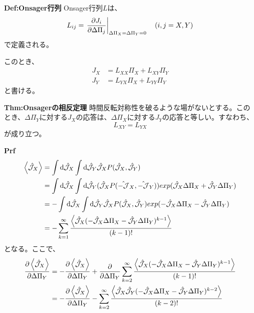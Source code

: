 \documentclass[a4paper,11pt]{jsarticle}
\begin{document}
\begin{itembox}[l]{\textbf{Def:Onsager行列}}
    Onsager行列$L$は、
    \begin{equation}
        L_{ij} = \left.\pdv{J_i}{\Delta \Pi_j}\right|_{\Delta \Pi_X=\Delta \Pi_Y=0} \quad (i,j = X,Y)
    \end{equation}
    で定義される。
\end{itembox}
このとき、
\begin{align}
    J_X &= L_{XX}\Pi_X + L_{XY}\Pi_Y\\
    J_Y &= L_{YX}\Pi_X + L_{YY}\Pi_Y
\end{align}
と書ける。\\
\begin{itembox}[l]{\textbf{Thm:Onsagerの相反定理}}
    時間反転対称性を破るような場がないとする。このとき、$\Delta \Pi_Y$に対する$J_X$の応答は、$\Delta \Pi_X$に対する$J_Y$の応答と等しい。すなわち、
    \begin{equation}
        L_{XY} = L_{YX}
    \end{equation}
    が成り立つ。
\end{itembox}
\textbf{Prf}\\
\begin{align}
    \ev{\hat{\mathcal{J}}_X} &= \int \dd \hat{\mathcal{J}}_X \int \dd \hat{\mathcal{J}}_Y \hat{\mathcal{J}}_X P(\hat{\mathcal{J}}_X, \hat{\mathcal{J}}_Y)\\
    &= \int \dd \hat{\mathcal{J}}_X \int \dd \hat{\mathcal{J}}_Y (\hat{\mathcal{J}}_X P(\hat{-\mathcal{J}}_X, \hat{-\mathcal{J}}_Y))exp(\hat{\mathcal{J}}_X \Delta \Pi_X + \hat{\mathcal{J}}_Y \Delta \Pi_Y)\\
    &= -\int \dd \hat{\mathcal{J}}_X \int \dd \hat{\mathcal{J}}_Y \hat{\mathcal{J}}_X P(\hat{\mathcal{J}}_X, \hat{\mathcal{J}}_Y)exp(-\hat{\mathcal{J}}_X \Delta \Pi_X - \hat{\mathcal{J}}_Y \Delta \Pi_Y)\\
    &= -\sum_{k=1}^{\infty} \frac{\ev{\hat{\mathcal{J}}_X(-\hat{\mathcal{J}}_X\Delta \Pi_X-\hat{\mathcal{J}}_Y\Delta \Pi_Y)^{k-1}}}{(k-1)!}
\end{align}
となる。ここで、
\begin{align}
    \pdv{\ev{\hat{\mathcal{J}}_X}}{\Delta \Pi_Y} &= -\pdv{\ev{\hat{\mathcal{J}}_X}}{\Delta \Pi_Y} + \pdv{\Delta \Pi_Y}\sum_{k=2}^{\infty} \frac{\ev{\hat{\mathcal{J}}_X(-\hat{\mathcal{J}}_X\Delta \Pi_X-\hat{\mathcal{J}}_Y\Delta \Pi_Y)^{k-1}}}{(k-1)!}\\
    &= -\pdv{\ev{\hat{\mathcal{J}}_X}}{\Delta \Pi_Y} - \sum_{k=2}^{\infty} \frac{\ev{\hat{\mathcal{J}}_X \hat{\mathcal{J}}_Y(-\hat{\mathcal{J}}_X\Delta \Pi_X-\hat{\mathcal{J}}_Y\Delta \Pi_Y)^{k-2}}}{(k-2)!}
\end{align}
\end{document}
